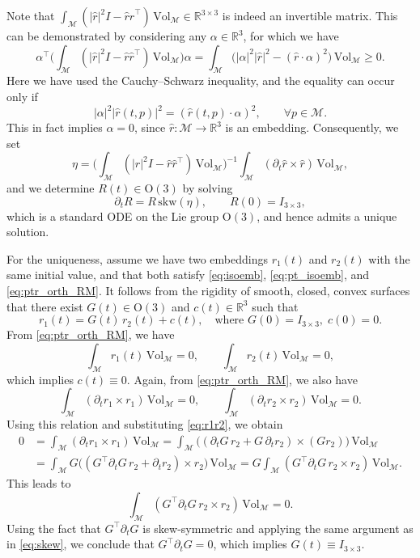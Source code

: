 \documentclass[11pt,a4paper,oneside,reqno]{amsart}
\theoremstyle{definition}
\theoremstyle{plain}
\numberwithin{theorem}{section}
\numberwithin{proposition}{section}
\numberwithin{lemma}{section}
\numberwithin{equation}{section}
\newcommand{\Man}{\mathcal{M}}
\newcommand{\Vol}{\mathrm{Vol}}
\begin{document}
Note that 
\(
    \int_{\Man} (|\hat r|^2 I - \hat r \hat r^{\top})\,\Vol_{\Man} 
    \in \mathbb{R}^{3\times 3}
\)
is indeed an invertible matrix. This can be demonstrated by considering any 
$\alpha \in \mathbb{R}^3$, for which we have
\[
    \alpha^{\top}
    \Big( \int_{\Man} (|\hat r|^2 I - \hat r \hat r^{\top})\,\Vol_{\Man} \Big)
    \alpha
    =
    \int_{\Man} \big( |\alpha|^2 |\hat r|^2 - (\hat r \cdot \alpha)^2 \big)\,\Vol_{\Man}
    \geq 0.
\]
Here we have used the Cauchy--Schwarz inequality, and the equality can occur only if
\[
    |\alpha|^2 |\hat r(t,p)|^2 = (\hat r(t,p) \cdot \alpha)^2,
    \qquad \forall p \in \Man.
\]
This in fact implies $\alpha = 0$, since 
$\hat r : \Man \to \mathbb{R}^3$ is an embedding.
Consequently, we set
\[
    \eta 
    = 
    \Big(
        \int_{\Man} (|\hat r|^2 I - \hat r \hat r^{\top})\,\Vol_{\Man}
    \Big)^{-1}
    \int_{\Man} (\partial_t \hat r \times \hat r)\,\Vol_{\Man},
\]
and we determine $R(t) \in \mathrm{O}(3)$ by solving
\[
    \partial_t R = R\,\mathrm{skw}(\eta),
    \qquad R(0) = I_{3 \times 3},
\]
which is a standard ODE on the Lie group $\mathrm{O}(3)$, and hence admits a unique solution.

For the uniqueness, assume we have two embeddings $r_1(t)$ and $r_2(t)$ 
with the same initial value, and that both satisfy 
\eqref{eq:isoemb}, \eqref{eq:pt_isoemb}, and \eqref{eq:ptr_orth_RM}. 
It follows from the rigidity of smooth, closed, convex surfaces 
\cite[Theorem~8.1.2]{han2006isometric} that there exist 
$G(t)\in\mathrm{O}(3)$ and $c(t)\in\mathbb{R}^3$ such that
\begin{equation}\label{eq:r1r2}
r_1(t) = G(t)\, r_2(t) + c(t),
\quad \text{where } G(0)=I_{3\times 3},\; c(0)=0.
\end{equation}
From \eqref{eq:ptr_orth_RM}, we have
\[
\int_{\Man} r_1(t)\,\Vol_{\Man}=0,
\qquad 
\int_{\Man} r_2(t)\,\Vol_{\Man}=0,
\]
which implies $c(t)\equiv 0$. 
Again, from \eqref{eq:ptr_orth_RM}, we also have 
\[
\int_{\Man} (\partial_t r_1 \times r_1)\,\Vol_{\Man}=0,
\qquad
\int_{\Man} (\partial_t r_2 \times r_2)\,\Vol_{\Man}=0.
\]
Using this relation and substituting \eqref{eq:r1r2}, we obtain
\[
\begin{aligned}
0 &= \int_{\Man} (\partial_t r_1 \times r_1)\,\Vol_{\Man} 
= \int_{\Man} \big( (\partial_t G\, r_2 + G\,\partial_t r_2)\times (G r_2) \big)\,\Vol_{\Man} \\
&= \int_{\Man} G\big((G^\top\partial_t G\, r_2 + \partial_t r_2) \times r_2\big)\,\Vol_{\Man} 
= G \int_{\Man} (G^\top\partial_t G\, r_2 \times r_2)\,\Vol_{\Man}.
\end{aligned}
\]
This leads to
\[
\int_{\Man} (G^\top\partial_t G\, r_2 \times r_2)\,\Vol_{\Man} = 0.
\]
Using the fact that $G^\top\partial_t G$ is skew-symmetric and applying the 
same argument as in \eqref{eq:skew}, we conclude that
\(G^\top\partial_t G = 0\),
which implies $G(t)\equiv I_{3\times 3}$.
\end{document}
